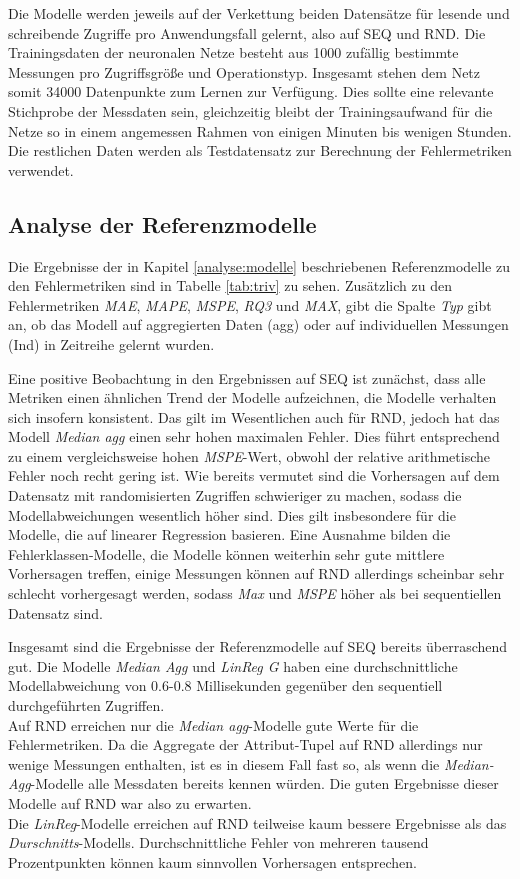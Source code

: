 \documentclass[
	12pt,
	a4paper,
	BCOR10mm,
	DIV14,
	listof=totoc,
	bibliography=totoc,
	headsepline
]{scrreprt}
\begin{document}
Die Modelle werden jeweils auf der Verkettung beiden Datensätze für lesende und schreibende Zugriffe pro Anwendungsfall gelernt, also auf SEQ und RND.
Die Trainingsdaten der neuronalen Netze besteht aus 1000 zufällig bestimmte Messungen pro Zugriffsgröße und Operationstyp. Insgesamt stehen dem Netz somit 34000 Datenpunkte zum Lernen zur Verfügung.
Dies sollte eine relevante Stichprobe der Messdaten sein, gleichzeitig bleibt der Trainingsaufwand für die Netze so in einem angemessen Rahmen von einigen Minuten bis wenigen Stunden.
Die restlichen Daten werden als Testdatensatz zur Berechnung der Fehlermetriken verwendet.

\subsection{Analyse der Referenzmodelle}
Die Ergebnisse der in Kapitel \ref{analyse:modelle} beschriebenen Referenzmodelle zu den Fehlermetriken sind in Tabelle \ref{tab:triv} zu sehen.
Zusätzlich zu den Fehlermetriken \textit{MAE}, \textit{MAPE}, \textit{MSPE}, \textit{RQ3} und \textit{MAX}, gibt die Spalte \textit{Typ} gibt an, ob das Modell auf aggregierten Daten (agg) oder auf individuellen Messungen (Ind) in Zeitreihe gelernt wurden.\medskip

Eine positive Beobachtung in den Ergebnissen auf SEQ ist zunächst, dass alle Metriken einen ähnlichen Trend der  Modelle aufzeichnen, die Modelle verhalten sich insofern konsistent.
Das gilt im Wesentlichen auch für RND, jedoch hat das Modell \textit{Median agg} einen sehr hohen maximalen Fehler. Dies führt entsprechend zu einem vergleichsweise hohen \textit{MSPE}-Wert, obwohl der relative arithmetische Fehler noch recht gering ist.
Wie bereits vermutet sind die Vorhersagen auf dem Datensatz mit randomisierten Zugriffen schwieriger zu machen, sodass die Modellabweichungen wesentlich höher sind.
Dies gilt insbesondere für die Modelle, die auf linearer Regression basieren.
Eine Ausnahme bilden die Fehlerklassen-Modelle, die Modelle können weiterhin sehr gute mittlere Vorhersagen treffen, einige Messungen können auf RND allerdings scheinbar sehr schlecht vorhergesagt werden, sodass \textit{Max} und \textit{MSPE} höher als bei sequentiellen Datensatz sind.\medskip

Insgesamt sind die Ergebnisse der Referenzmodelle auf SEQ bereits überraschend gut.
Die Modelle \textit{Median Agg} und \textit{LinReg G} haben eine durchschnittliche Modellabweichung von 0.6-0.8 Millisekunden gegenüber den sequentiell durchgeführten Zugriffen.\\
Auf RND erreichen nur die \textit{Median agg}-Modelle gute Werte für die Fehlermetriken.
Da die Aggregate der Attribut-Tupel auf RND allerdings nur wenige Messungen enthalten, ist es in diesem Fall fast so, als wenn die \textit{Median-Agg}-Modelle alle Messdaten bereits kennen würden. Die guten Ergebnisse dieser Modelle auf RND war also zu erwarten.\\
Die \textit{LinReg}-Modelle erreichen auf RND teilweise kaum bessere Ergebnisse als das \textit{Durschnitts}-Modells.
Durchschnittliche Fehler von mehreren tausend Prozentpunkten können kaum sinnvollen Vorhersagen entsprechen. \medskip
\end{document}
